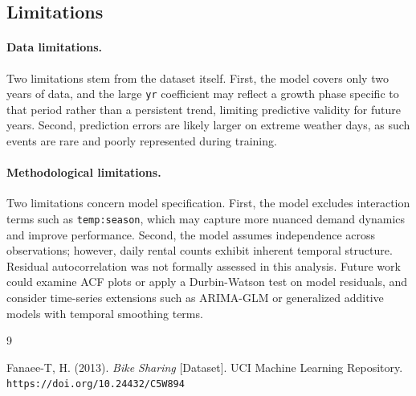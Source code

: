 \documentclass[12pt, a4paper]{article}
\begin{document}
\subsection{Limitations}

\paragraph{Data limitations.}
Two limitations stem from the dataset itself. First, the model covers
only two years of data, and the large \texttt{yr} coefficient may
reflect a growth phase specific to that period rather than a persistent
trend, limiting predictive validity for future years. Second, prediction
errors are likely larger on extreme weather days, as such events are
rare and poorly represented during training.

\paragraph{Methodological limitations.}
Two limitations concern model specification. First, the model excludes
interaction terms such as \texttt{temp:season}, which may capture more
nuanced demand dynamics and improve performance. Second, the model
assumes independence across observations; however, daily rental counts
exhibit inherent temporal structure. Residual autocorrelation was not
formally assessed in this analysis. Future work could examine ACF plots
or apply a Durbin-Watson test on model residuals, and consider
time-series extensions such as ARIMA-GLM or generalized additive models
with temporal smoothing terms.



\begin{thebibliography}{9}
 
Fanaee-T, H. (2013).
\textit{Bike Sharing} [Dataset].
UCI Machine Learning Repository.
\texttt{https://doi.org/10.24432/C5W894}
 
\end{thebibliography}
\end{document}
